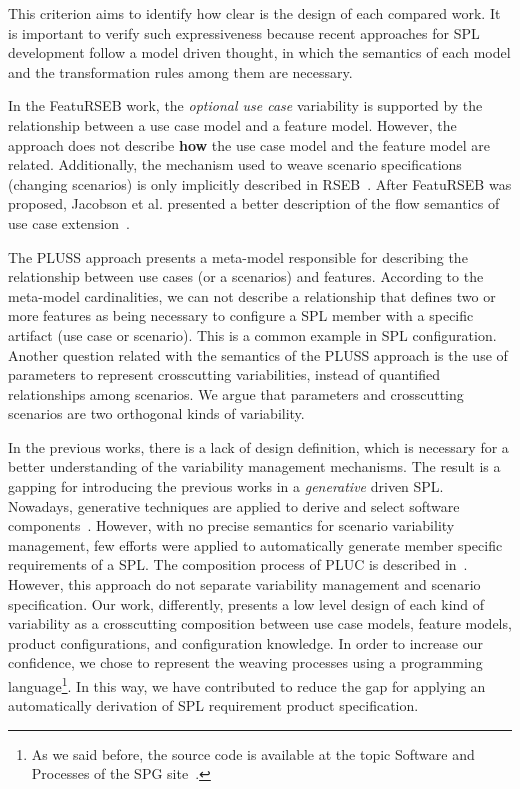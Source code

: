 \documentclass{llncs}
\begin{document}
This criterion aims to identify how clear is the design of each compared
work. It is important to verify such expressiveness because recent approaches
for SPL development follow a model driven thought, in which the semantics of
each model and the transformation rules among them are necessary.

In the FeatuRSEB work, the \emph{optional use case} variability is
supported by the relationship between a use case model and a feature
model. However, the approach does not describe {\bf how} the use
case model and the feature model are related. Additionally, the
mechanism used to weave scenario specifications (changing scenarios)
is only implicitly described in RSEB~\cite{jacobson-reuse-book}.
After FeatuRSEB was proposed, Jacobson et al. presented a better
description of the flow semantics of use case extension~\cite{jacobson-aosd-book}.

The PLUSS approach presents a meta-model responsible for describing
the relationship between use cases (or a scenarios) and features.
According  to the meta-model cardinalities, we can not describe a
relationship that defines two or more features as being necessary to
configure a SPL member with a specific artifact (use case or
scenario). This is a common example in SPL configuration. Another
question related with the semantics of the PLUSS approach is the use
of parameters to represent crosscutting variabilities, instead of
quantified relationships among scenarios. We argue that parameters
and crosscutting scenarios are two orthogonal kinds of variability. 

In the previous works, there is a lack of design definition, which
is necessary for a better understanding of the variability
management mechanisms. The result is a gapping for introducing the
previous works in a \emph{generative} driven SPL. Nowadays,
generative techniques are applied to derive and select software
components~\cite{czarnecki-book,greenfield-softwarefactories,butler-icse-2001,krueger-cacm-200712}. 
However, with no precise semantics for scenario variability management, few efforts were
applied to automatically generate member specific requirements of a
SPL. The composition process of PLUC is described in~\cite{fantechi-splc-2004}. 
However, this approach do not separate variability management and scenario 
specification. Our work, differently, presents a low level design of each
kind of variability as a crosscutting composition between use case models, feature models, product 
configurations, and configuration knowledge. In order to increase our confidence, we chose
to represent the weaving processes using a programming
language\footnote{As we said before, the source code is available at
the topic Software and Processes of the SPG site~\cite{spg-url}.}.
In this way, we have contributed to reduce the gap for applying an
automatically derivation of SPL requirement product specification.
\end{document}
